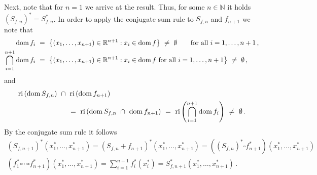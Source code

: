 \begin{example*}
  Next, note that for $n=1$ we arrive at the result. Thus, for some $n\in \mathbb{N}$ it holds
  $
  \left( 
    S_{f,n}
  \right)
  ^*
  =
    S_{f,n}^*
  $.
  In order to apply the conjugate sum rule to 
  $
    S_{f,n}
  $
  and
  $
    f_{n+1}
  $
  we note that
  \begin{align*}
    \mathrm{dom}\, f_i
    &
    \ =\ 
    \left\{ 
      (x_1,\ldots,x_{n+1})
      \in \R^{n+1}
      :
      x_i\in \mathrm{dom}\,f
    \right\}
    \ 
    \neq 
    \ 
    \emptyset
    \qquad
    \text{for all}
    \ 
    i=1,\ldots,n+1
    \,,
    \\
    \bigcap_{i=1}^{n+1}
    \mathrm{dom}\, f_i
    &
    \ =\ 
    \left\{ 
      (x_1,\ldots,x_{n+1})
      \in \R^{n+1}
      :
      x_i\in \mathrm{dom}\,f
      \ 
    \text{for all}
    \ 
    i=1,\ldots,n+1
    \right\}
    \ 
    \neq 
    \ 
    \emptyset
    \,,
  \end{align*}
  and
\begin{align*}
  &
  \mathrm{ri}\left( 
    \mathrm{dom}\,S_{f,n}
  \right)
  \ 
  \cap
  \ 
  \mathrm{ri}\left( 
    \mathrm{dom}\,f_{n+1}
  \right)
  \\
  &
  \hspace{25mm}
  =
  \ 
  \mathrm{ri}\left( 
    \mathrm{dom}\,S_{f,n}
  \ 
  \cap
  \ 
    \mathrm{dom}\,f_{n+1}
  \right)
  \ 
  =
  \ 
  \mathrm{ri}
  \left( 
    \bigcap_{i=1}^{n+1}
    \mathrm{dom}\, f_i
  \right)
  \ 
  \neq
  \ 
  \emptyset
  \,.
\end{align*}
By the conjugate sum rule it follows
\begin{align*}
  (
  S_{f,n+1}
  )^*
  (x_1^*,\ldots,x_{n+1}^*)
  =
  (
  S_{f,n}
  +
  f_{n+1}
  )^*
  (x_1^*,\ldots,x_{n+1}^*)
  =
  (
  (
  S_{f,n}
  )
  ^*
  \square
  f_{n+1}^*
  )
  (x_1^*,\ldots,x_{n+1}^*)
  \\
  (
  f_1^*
  \square\cdots \square
  f_{n+1}^*
  )
  (x_1^*,\ldots,x_{n+1}^*)
  =
  \sum_{i=1}^{n+1} 
  f_{i}^*
  (x_{i}^*)
  =
  S^*_{f,n+1}
  (x_1^*,\ldots,x_{n+1}^*)
  \,.
\end{align*}
\end{example*}






